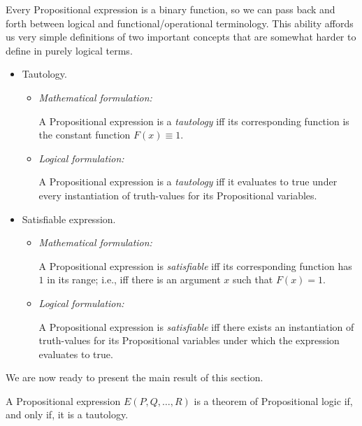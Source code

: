 \medskip

 
Every Propositional expression is a binary function, so we can pass back and forth between logical and functional/operational terminology.  This ability affords us very simple definitions of two important concepts that are somewhat harder to define in purely logical terms.
\begin{itemize}
\item
{\sf Tautology}. 
  \begin{itemize}
  \item
{\it Mathematical formulation:}

\smallskip

A Propositional expression is a {\it tautology} iff its corresponding function is the constant function $F(x) \equiv 1$.
  \medskip\item
{\it Logical formulation:}

\smallskip

A Propositional expression is a {\it tautology} iff it evaluates to {\sc true} under every instantiation of truth-values for its Propositional variables.
  \end{itemize}
\item
{\sf Satisfiable expression}.
  \begin{itemize}
  \item
{\it Mathematical formulation:}

\smallskip

A Propositional expression is {\it satisfiable} iff its corresponding function has $1$ in its range; i.e., iff there is an argument $x$ such that $F(x) = 1$.
  \medskip\item
{\it Logical formulation:}

\smallskip

A Propositional expression is {\it satisfiable} iff there exists an instantiation of truth-values for its Propositional variables under which the expression evaluates to {\sc true}.
  \end{itemize}
\end{itemize}

\medskip

\noindent
We are now ready to present the main result of this section.

\begin{theorem}
\label{thm:Prop-calc-isfree}
A Propositional expression $E(P, Q, \ldots, R)$ is a theorem of Propositional logic if, and only if, it is a tautology.
\end{theorem}

